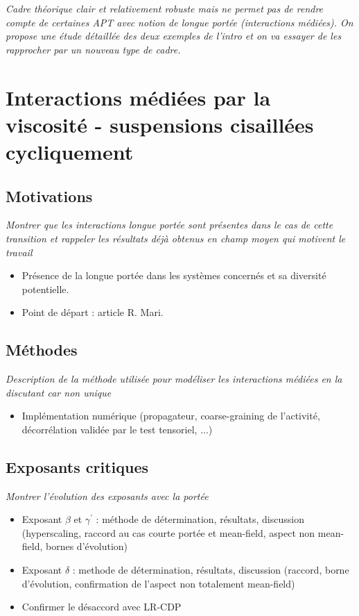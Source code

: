 \documentclass[10pt,a4paper]{article}
\begin{document}
\textit{Cadre théorique clair et relativement robuste mais ne permet pas de rendre compte de certaines APT avec notion de longue portée (interactions médiées). On propose une étude détaillée des deux exemples de l'intro et on va essayer de les rapprocher par un nouveau type de cadre.}

\section{Interactions médiées par la viscosité - suspensions cisaillées cycliquement}

\subsection{Motivations}

\textit{Montrer que les interactions longue portée sont présentes dans le cas de cette transition et rappeler les résultats déjà obtenus en champ moyen qui motivent le travail}

\begin{itemize}
	\item Présence de la longue portée dans les systèmes concernés et sa diversité potentielle.
	\item Point de départ : article R. Mari.
\end{itemize}

\subsection{Méthodes}

\textit{Description de la méthode utilisée pour modéliser les interactions médiées en la discutant car non unique}

\begin{itemize}
	\item Implémentation numérique (propagateur, coarse-graining de l'activité, décorrélation validée par le test tensoriel, ...)
\end{itemize}

\subsection{Exposants critiques}

\textit{Montrer l'évolution des exposants avec la portée}

\begin{itemize}
	\item Exposant $\beta$ et $\gamma^\prime$ : méthode de détermination, résultats, discussion (hyperscaling, raccord au cas courte portée et mean-field, aspect non mean-field, bornes d'évolution)
	\item Exposant $\delta$ : methode de détermination, résultats, discussion (raccord, borne d'évolution, confirmation de l'aspect non totalement mean-field)
	\item Confirmer le désaccord avec LR-CDP
\end{itemize}
\end{document}
